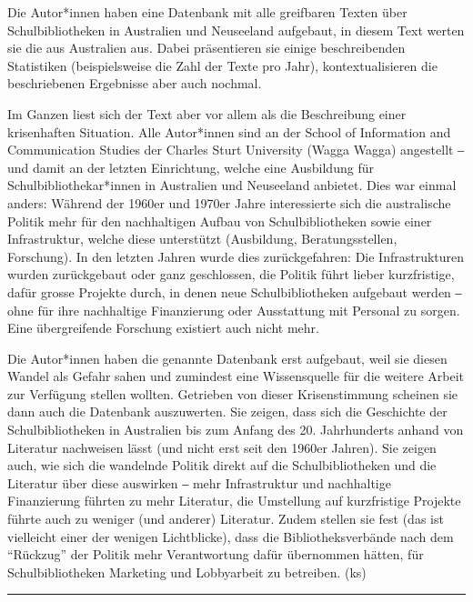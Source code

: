 \documentclass[a4paper,
fontsize=11pt,
oneside,
numbers=noperiodatend,
parskip=half-,
bibliography=totoc,
final
]{scrartcl}
\begin{document}
Die Autor*innen haben eine Datenbank mit alle greifbaren Texten über
Schulbibliotheken in Australien und Neuseeland aufgebaut, in diesem Text
werten sie die aus Australien aus. Dabei präsentieren sie einige
beschreibenden Statistiken (beispielsweise die Zahl der Texte pro Jahr),
kontextualisieren die beschriebenen Ergebnisse aber auch nochmal.

Im Ganzen liest sich der Text aber vor allem als die Beschreibung einer
krisenhaften Situation. Alle Autor*innen sind an der School of
Information and Communication Studies der Charles Sturt University
(Wagga Wagga) angestellt ‒ und damit an der letzten Einrichtung, welche
eine Ausbildung für Schulbibliothekar*innen in Australien und Neuseeland
anbietet. Dies war einmal anders: Während der 1960er und 1970er Jahre
interessierte sich die australische Politik mehr für den nachhaltigen
Aufbau von Schulbibliotheken sowie einer Infrastruktur, welche diese
unterstützt (Ausbildung, Beratungsstellen, Forschung). In den letzten
Jahren wurde dies zurückgefahren: Die Infrastrukturen wurden
zurückgebaut oder ganz geschlossen, die Politik führt lieber
kurzfristige, dafür grosse Projekte durch, in denen neue
Schulbibliotheken aufgebaut werden ‒ ohne für ihre nachhaltige
Finanzierung oder Ausstattung mit Personal zu sorgen. Eine übergreifende
Forschung existiert auch nicht mehr.

Die Autor*innen haben die genannte Datenbank erst aufgebaut, weil sie
diesen Wandel als Gefahr sahen und zumindest eine Wissensquelle für die
weitere Arbeit zur Verfügung stellen wollten. Getrieben von dieser
Krisenstimmung scheinen sie dann auch die Datenbank auszuwerten. Sie
zeigen, dass sich die Geschichte der Schulbibliotheken in Australien bis
zum Anfang des 20. Jahrhunderts anhand von Literatur nachweisen lässt
(und nicht erst seit den 1960er Jahren). Sie zeigen auch, wie sich die
wandelnde Politik direkt auf die Schulbibliotheken und die Literatur
über diese auswirken ‒ mehr Infrastruktur und nachhaltige Finanzierung
führten zu mehr Literatur, die Umstellung auf kurzfristige Projekte
führte auch zu weniger (und anderer) Literatur. Zudem stellen sie fest
(das ist vielleicht einer der wenigen Lichtblicke), dass die
Bibliotheksverbände nach dem \enquote{Rückzug} der Politik mehr
Verantwortung dafür übernommen hätten, für Schulbibliotheken Marketing
und Lobbyarbeit zu betreiben. (ks)

\begin{center}\rule{0.5\linewidth}{0.5pt}\end{center}
\end{document}
